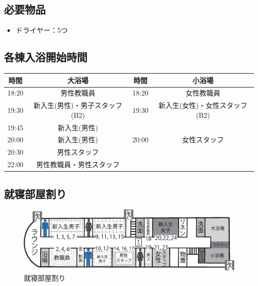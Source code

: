 \subsection{必要物品}
\begin{itemize}
\item ドライヤー：5つ
\end{itemize}

\subsection{各棟入浴開始時間}
\label{sec:bath}
\begin{table}[h]
\begin{center}
\begin{tabular}{|c|c|c|c|}
\hline
 {時間}&{大浴場}&{時間}&{小浴場} \\ \hline
 18:20 & 男性教職員 & 18:20 & 女性教職員 \\ \hline
 19:30 & 新入生(男性)・男子スタッフ(B2) & 19:30 & 新入生(女性)・女性スタッフ(B2) \\ \hline
 19:45 & 新入生(男性) & & \\ \hline 
 20:00 & 新入生(男性) & 20:00 & 女性スタッフ\\ \hline
 20:30 & 男性スタッフ & & \\ \hline
 22:00 & 男性教職員・男性スタッフ & & \\ \hline
\end{tabular}
\end{center}
\end{table}

\subsection{就寝部屋割り}
\begin{figure}[H]
\begin{center}
\includegraphics[scale=0.6]{./10/syushin.eps}
\vspace{-45mm}
\caption{就寝部屋割り}
\label{fig:futon_katazuke}
\end{center}
\end{figure}

